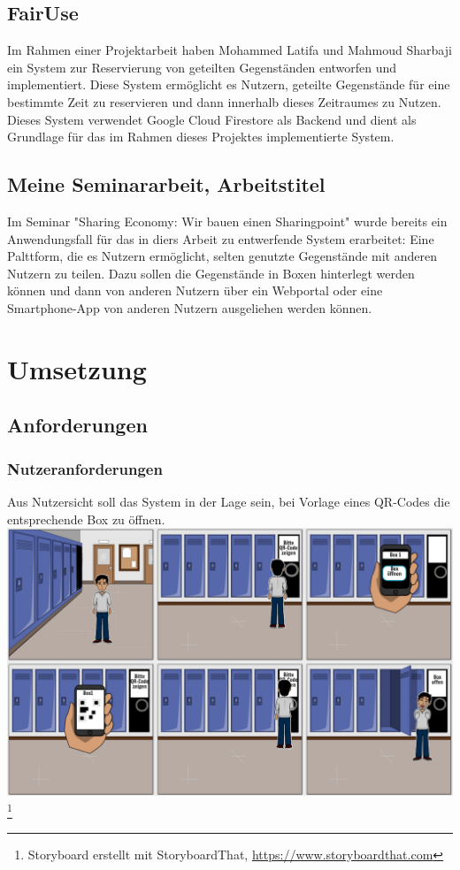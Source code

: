 \documentclass[openright,twoside,a4paper]{scrartcl}
\begin{document}
        \subsection{FairUse}
            Im Rahmen einer Projektarbeit haben Mohammed Latifa und Mahmoud Sharbaji ein System zur Reservierung von geteilten Gegenständen entworfen und implementiert. Diese System ermöglicht es Nutzern, geteilte Gegenstände für eine bestimmte Zeit zu reservieren und dann innerhalb dieses Zeitraumes zu Nutzen.\cite{FairUse} \\ Dieses System verwendet Google Cloud Firestore als Backend und dient als Grundlage für das im Rahmen dieses Projektes implementierte System.
        
        \subsection{Meine Seminararbeit, Arbeitstitel}
            Im Seminar "Sharing Economy: Wir bauen einen Sharingpoint" wurde bereits ein Anwendungsfall für das in diers Arbeit zu entwerfende System erarbeitet: Eine Palttform, die es Nutzern ermöglicht, selten genutzte Gegenstände mit anderen Nutzern zu teilen. Dazu sollen die Gegenstände in Boxen hinterlegt werden können und dann von anderen Nutzern über ein Webportal oder eine Smartphone-App von anderen Nutzern ausgeliehen werden können.\cite{seminar}

    \section{Umsetzung}
        \subsection{Anforderungen}
            \subsubsection{Nutzeranforderungen}
                Aus Nutzersicht soll das System in der Lage sein, bei Vorlage eines QR-Codes die entsprechende Box zu öffnen.\\
                \includegraphics[scale=0.3]{Bilder/Stroyboard.png}
                \footnote{Storyboard erstellt mit StoryboardThat, \url{https://www.storyboardthat.com}}
\end{document}
